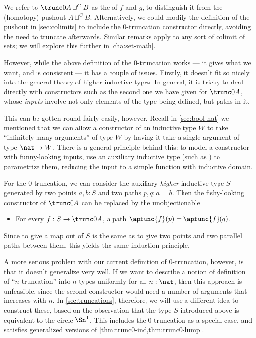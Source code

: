 We refer to $\trunc0{A\sqcup^C B}$ as the 
%
of $f$ and $g$, to distinguish it from the (homotopy) pushout $A\sqcup^C B$.
Alternatively, we could modify the definition of the pushout in \cref{sec:colimits} to include the $0$-truncation constructor directly, avoiding the need to truncate afterwards.
Similar remarks apply to any sort of colimit of sets; we will explore this further in \cref{cha:set-math}.

However, while the above definition of the 0-truncation works --- it gives what we want, and is consistent --- it has a couple of issues.
Firstly, it doesn't fit so nicely into the general theory of higher inductive types.
In general, it is tricky to deal directly with constructors such as the second one we have given for $\trunc0A$, whose \emph{inputs} involve not only elements of the type being defined, but paths in it.

This can be gotten round fairly easily, however.
Recall in \cref{sec:bool-nat} we mentioned that we can allow a constructor of an inductive type $W$ to take ``infinitely many arguments'' of type $W$ by having it take a single argument of type $\nat\to W$.
There is a general principle behind this: to model a constructor with funny-looking inputs, use an auxiliary inductive type (such as \nat) to parametrize them, reducing the input to a simple function with inductive domain.

For the 0-truncation, we can consider the auxiliary \emph{higher} inductive type $S$ generated by two points $a,b:S$ and two paths $p,q:a=b$.
Then the fishy-looking constructor of $\trunc 0A$ can be replaced by the unobjectionable
\begin{itemize}
\item For every $f:S\to \trunc 0A$, a path $\apfunc{f}(p) = \apfunc{f}(q)$.
\end{itemize}
Since to give a map out of $S$ is the same as to give two points and two parallel paths between them, this yields the same induction principle.

%

%
%
A more serious problem with our current definition of $0$-truncation, however, is that it doesn't generalize very well.
If we want to describe a notion of definition of ``$n$-truncation'' into $n$-types uniformly for all $n:\nat$, then this approach is unfeasible, since the second constructor would need a number of arguments that increases with $n$.
In \cref{sec:truncations}, therefore, we will use a different idea to construct these, based on the observation that the type $S$ introduced above is equivalent to the circle $\Sn^1$.
This includes the 0-truncation as a special case, and satisfies generalized versions of \cref{thm:trunc0-ind,thm:trunc0-lump}.


